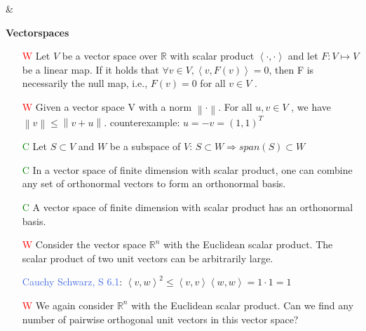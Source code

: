 \documentclass[7pt,landscape, margin = 0.1mm]{article}
\begin{document}
\begin{multicols}{4}
\begin{flushleft}
\begin{itemize}
\end{itemize}
\hspace{3mm}
\hline & \\[3mm]
\scriptsize

\textbf{Vectorspaces}
\tiny \\
\begin{itemize}
\item[\textcolor{red}{W}]Let $V$ be a vector space over $\mathbb{R}$ with scalar product $\left< \cdot, \cdot \right> $ and let $F : V \mapsto V$ be a linear map. If it
holds that $\forall v \in V, \left< v, F(v) \right> = 0$, then F is necessarily the null map, i.e., $F(v) = 0 $ for all  $v \in V$ . 

\item[\textcolor{red}{W}] 
Given a vector space V with a norm $\left\| \cdot \right\|$. For all $ u,v \in V $ , we have $\left\| v \right\| \leq \left\| v+u \right\|$.
\textcolor{Emerald}{counterexample: $u=-v= (1 ,1)^T$ }
\item[\textcolor{green}{C}] Let $S \subset V $ and $W $ be a subspace of $V $: $S \subset W \Rightarrow span(S) \subset W$

\item[\textcolor{green}{C}] In a vector space of finite dimension with scalar product, one can combine any set of orthonormal vectors to form an orthonormal basis.

\item[\textcolor{green}{C}] A vector space of finite dimension with scalar product has an orthonormal basis.

\item[\textcolor{red}{W}] Consider the vector space $\mathbb{R}^n$ with the Euclidean scalar product. The scalar product of two unit vectors can be arbitrarily large.

\textcolor{Emerald}{\textcolor{RoyalBlue}{Cauchy Schwarz, S 6.1}: $\left< v,w\right>^2 \leq \left< v,v\right>\left<w,w \right> = 1 \cdot 1 = 1$}

\item[\textcolor{red}{W}] We again consider $\mathbb{R}^n$ with the Euclidean scalar product. Can we find any number of pairwise orthogonal unit vectors in this vector space?

\end{itemize}

\hspace{3mm}



\end{flushleft}
\end{multicols}
\end{document}
